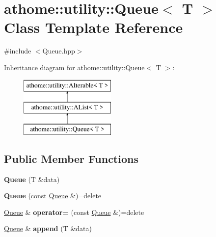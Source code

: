 \hypertarget{classathome_1_1utility_1_1_queue}{}\section{athome\+:\+:utility\+:\+:Queue$<$ T $>$ Class Template Reference}
\label{classathome_1_1utility_1_1_queue}


{\ttfamily \#include $<$Queue.\+hpp$>$}

Inheritance diagram for athome\+:\+:utility\+:\+:Queue$<$ T $>$\+:\begin{figure}[H]
\begin{center}
\leavevmode
\includegraphics[height=3.000000cm]{classathome_1_1utility_1_1_queue}
\end{center}
\end{figure}
\subsection*{Public Member Functions}
\begin{DoxyCompactItemize}
\item 
\mbox{\label{classathome_1_1utility_1_1_queue_a1e600c60121fa653363e98634faf074b}} 
{\bfseries Queue} (T \&data)
\item 
\mbox{\label{classathome_1_1utility_1_1_queue_a1242a9ec752f798978088c588eb5c8d1}} 
{\bfseries Queue} (const \mbox{\hyperlink{classathome_1_1utility_1_1_queue}{Queue}} \&)=delete
\item 
\mbox{\label{classathome_1_1utility_1_1_queue_ac1dd0147e8ecb3e64f611a171a03befd}} 
\mbox{\hyperlink{classathome_1_1utility_1_1_queue}{Queue}} \& {\bfseries operator=} (const \mbox{\hyperlink{classathome_1_1utility_1_1_queue}{Queue}} \&)=delete
\item 
\mbox{\label{classathome_1_1utility_1_1_queue_a7b50e72381185b3e624703eaacdbcba4}} 
\mbox{\hyperlink{classathome_1_1utility_1_1_queue}{Queue}} \& {\bfseries append} (T \&data)
\end{DoxyCompactItemize}
